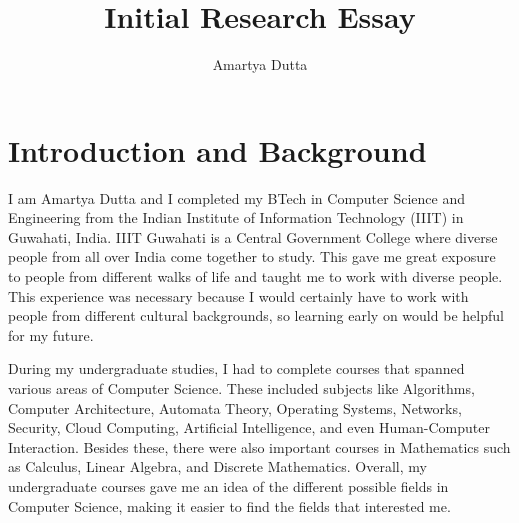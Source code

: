 \documentclass[11pt]{article}
\title{\textbf{Initial Research Essay}}
\author{Amartya Dutta}
\date{}
\begin{document}
\clearpage\maketitle
\thispagestyle{empty}

\section{Introduction and Background}
I am Amartya Dutta and I completed my BTech in Computer Science and Engineering from the Indian Institute of Information Technology (IIIT) in Guwahati, India. IIIT Guwahati is a Central Government College where diverse people from all over India come together to study. This gave me great exposure to people from different walks of life and taught me to work with diverse people. This experience was necessary because I would certainly have to work with people from different cultural backgrounds, so learning early on would be helpful for my future. \par
During my undergraduate studies, I had to complete courses that spanned various areas of  Computer Science. These included subjects like Algorithms, Computer Architecture, Automata Theory, Operating Systems, Networks, Security, Cloud Computing, Artificial Intelligence, and even Human-Computer Interaction. Besides these, there were also important courses in Mathematics such as Calculus, Linear Algebra, and Discrete Mathematics. Overall, my undergraduate courses gave me an idea of the different possible fields in Computer Science, making it easier to find the fields that interested me. \par
\end{document}
